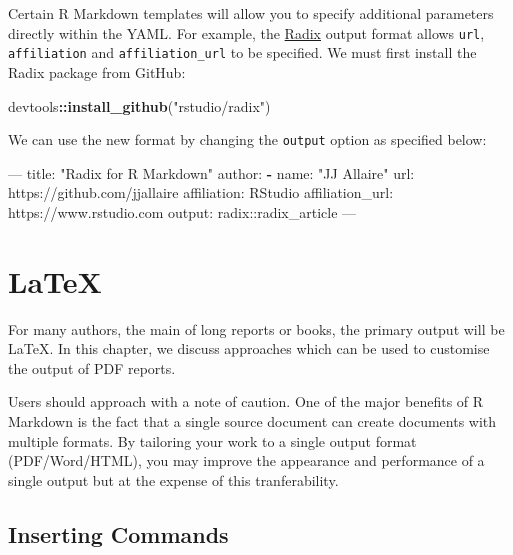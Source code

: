 \documentclass[]{book}
\newenvironment{Shaded}{\begin{snugshade}}{\end{snugshade}}
\newcommand{\KeywordTok}[1]{\textcolor[rgb]{0.13,0.29,0.53}{\textbf{#1}}}
\newcommand{\StringTok}[1]{\textcolor[rgb]{0.31,0.60,0.02}{#1}}
\newcommand{\OtherTok}[1]{\textcolor[rgb]{0.56,0.35,0.01}{#1}}
\newcommand{\FunctionTok}[1]{\textcolor[rgb]{0.00,0.00,0.00}{#1}}
\newcommand{\OperatorTok}[1]{\textcolor[rgb]{0.81,0.36,0.00}{\textbf{#1}}}
\newcommand{\AttributeTok}[1]{\textcolor[rgb]{0.77,0.63,0.00}{#1}}
\newcommand{\NormalTok}[1]{#1}
\begin{document}
Certain R Markdown templates will allow you to specify additional
parameters directly within the YAML. For example, the
\href{https://rstudio.github.io/radix/}{Radix} output format allows
\texttt{url}, \texttt{affiliation} and \texttt{affiliation\_url} to be
specified. We must first install the Radix package from GitHub:

\begin{Shaded}
\begin{Highlighting}[]
\NormalTok{devtools}\OperatorTok{::}\KeywordTok{install_github}\NormalTok{(}\StringTok{"rstudio/radix"}\NormalTok{)}
\end{Highlighting}
\end{Shaded}

We can use the new format by changing the \texttt{output} option as
specified below:

\begin{Shaded}
\begin{Highlighting}[]
\OtherTok{---}
\FunctionTok{title:}\AttributeTok{ }\StringTok{"Radix for R Markdown"}
\FunctionTok{author:}
  \KeywordTok{-} \FunctionTok{name:}\AttributeTok{ }\StringTok{"JJ Allaire"}
    \FunctionTok{url:}\AttributeTok{ https://github.com/jjallaire}
    \FunctionTok{affiliation:}\AttributeTok{ RStudio}
    \FunctionTok{affiliation_url:}\AttributeTok{ https://www.rstudio.com}
\FunctionTok{output:}\AttributeTok{ radix::radix_article}
\OtherTok{---}
\end{Highlighting}
\end{Shaded}

\chapter{LaTeX}\label{latex}

For many authors, the main of long reports or books, the primary output
will be LaTeX. In this chapter, we discuss approaches which can be used
to customise the output of PDF reports.

Users should approach with a note of caution. One of the major benefits
of R Markdown is the fact that a single source document can create
documents with multiple formats. By tailoring your work to a single
output format (PDF/Word/HTML), you may improve the appearance and
performance of a single output but at the expense of this
tranferability.

\section{Inserting Commands}\label{inserting-commands}
\end{document}

